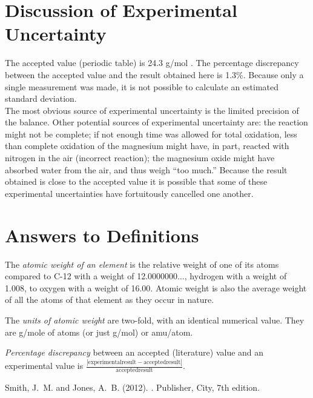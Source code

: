 \documentclass{article}
\begin{document}
\section{Discussion of Experimental Uncertainty}

The accepted value (periodic table) is 24.3 g/mol \cite{Smith:2012qr}. The percentage discrepancy between the accepted value and the result obtained here is 1.3\%. Because only a single measurement was made, it is not possible to calculate an estimated standard deviation. \\

The most obvious source of experimental uncertainty is the limited precision of the balance. Other potential sources of experimental uncertainty are: the reaction might not be complete; if not enough time was allowed for total oxidation, less than complete oxidation of the magnesium might have, in part, reacted with nitrogen in the air (incorrect reaction); the magnesium oxide might have absorbed water from the air, and thus weigh ``too much.'' Because the result obtained is close to the accepted value it is possible that some of these experimental uncertainties have fortuitously cancelled one another.


\section{Answers to Definitions}

\begin{enumerate}
\begin{item}
The \emph{atomic weight of an element} is the relative weight of one of its atoms compared to C-12 with a weight of 12.0000000$\ldots$, hydrogen with a weight of 1.008, to oxygen with a weight of 16.00. Atomic weight is also the average weight of all the atoms of that element as they occur in nature.
\end{item}
\begin{item}
The \emph{units of atomic weight} are two-fold, with an identical numerical value. They are g/mole of atoms (or just g/mol) or amu/atom.
\end{item}
\begin{item}
\emph{Percentage discrepancy} between an accepted (literature) value and an experimental value is $\frac{|\mathrm{experimental result} - \mathrm{accepted result}|}{\mathrm{accepted result}}$.
\end{item}
\end{enumerate}


\begin{thebibliography}{9}

Smith, J.~M. and Jones, A.~B. (2012).
.
\newblock Publisher, City, 7th edition.

\end{thebibliography}
\end{document}
